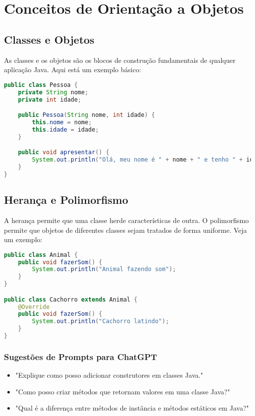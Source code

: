 \documentclass[a4paper,12pt]{book}
\begin{document}
\chapter{Conceitos de Orientação a Objetos}
\section{Classes e Objetos}
As classes e os objetos são os blocos de construção fundamentais de qualquer aplicação Java. Aqui está um exemplo básico:

\begin{lstlisting}[language=Java]
public class Pessoa {
    private String nome;
    private int idade;

    public Pessoa(String nome, int idade) {
        this.nome = nome;
        this.idade = idade;
    }

    public void apresentar() {
        System.out.println("Olá, meu nome é " + nome + " e tenho " + idade + " anos.");
    }
}
\end{lstlisting}

\section{Herança e Polimorfismo}
A herança permite que uma classe herde características de outra. O polimorfismo permite que objetos de diferentes classes sejam tratados de forma uniforme. Veja um exemplo:

\begin{lstlisting}[language=Java]
public class Animal {
    public void fazerSom() {
        System.out.println("Animal fazendo som");
    }
}

public class Cachorro extends Animal {
    @Override
    public void fazerSom() {
        System.out.println("Cachorro latindo");
    }
}
\end{lstlisting}

\subsection{Sugestões de Prompts para ChatGPT}

\begin{itemize}
    \item "Explique como posso adicionar construtores em classes Java."
    \item "Como posso criar métodos que retornam valores em uma classe Java?"
    \item "Qual é a diferença entre métodos de instância e métodos estáticos em Java?"
\end{itemize}
\end{document}
